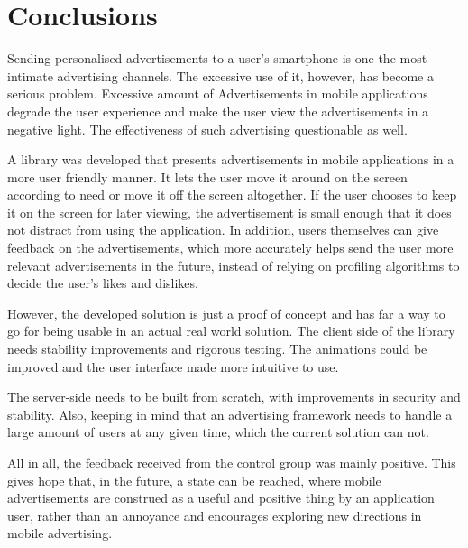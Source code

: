 \chapter{Conclusions}

Sending personalised advertisements to a user's smartphone is one the most intimate advertising channels. The excessive use of it, however, has become a serious problem. Excessive amount of Advertisements in mobile applications degrade the user experience and make the user view the advertisements in a negative light. The effectiveness of such advertising questionable as well.

A library was developed that presents advertisements in mobile applications in a more user friendly manner. It lets the user move it around on the screen according to need or move it off the screen altogether. If the user chooses to keep it on the screen for later viewing, the advertisement is small enough that it does not distract from using the application. In addition, users themselves can give feedback on the advertisements, which more accurately helps send the user more relevant advertisements in the future, instead of relying on profiling algorithms to decide the user's likes and dislikes.

However, the developed solution is just a proof of concept and has far a way to go for being usable in an actual real world solution. The client side of the library needs stability improvements and rigorous testing. The animations could be improved and the user interface made more intuitive to use.

The server-side needs to be built from scratch, with improvements in security and stability. Also, keeping in mind that an advertising framework needs to handle a large amount of users at any given time, which the current solution can not.

All in all, the feedback received from the control group was mainly positive. This gives hope that, in the future, a state can be reached, where mobile advertisements are construed as a useful and positive thing by an application user, rather than an annoyance and encourages exploring new directions in mobile advertising.